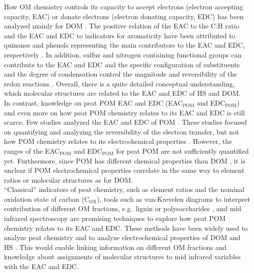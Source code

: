 \documentclass[alpha-refs]{wiley-article-rmd}
\begin{document}
\begin{refsection}
How OM chemistry controls its capacity to accept electrons (electron accepting capacity, EAC) or donate electrons (electron donating capacity, EDC) has been analyzed mainly for DOM \autocite{Ratasuk.2007,Aeschbacher.2010,Aeschbacher.2012,Fimmen.2007,HernandezMontoya.2012,Tan.2017,Walpen.2018,LaCroix.2020}. The positive relation of the EAC to the C:H ratio and the EAC and EDC to indicators for aromaticity have been attributed to quinones and phenols representing the main contributors to the EAC and EDC, respectively \autocite{Aeschbacher.2010,Tan.2017}. In addition, sulfur and nitrogen containing functional groups can contribute to the EAC and EDC \autocite{Fimmen.2007,Ratasuk.2007,HernandezMontoya.2012} and the specific configuration of substituents and the degree of condensation control the magnitude and reversibility of the redox reactions \autocite{Ratasuk.2007,Uchimiya.2009}. Overall, there is a quite detailed conceptual understanding, which molecular structures are related to the EAC and EDC of HS and DOM.\\
In contrast, knowledge on peat POM EAC and EDC (EAC\(_\text{POM}\) and EDC\(_\text{POM}\)) and even more on how peat POM chemistry relates to its EAC and EDC is still scarce. Few studies analyzed the EAC and EDC of POM \autocite{Keller.2013,Lau.2015,Lau.2016,Gao.2019}. These studies focused on quantifying and analyzing the reversibility of the electron transfer, but not how POM chemistry relates to its electrochemical properties \autocite{Keller.2013,Lau.2015,Lau.2016,Gao.2019}. However, the ranges of the EAC\(_\text{POM}\) and EDC\(_\text{POM}\) for peat POM are not sufficiently quantified yet. Furthermore, since POM has different chemical properties than DOM \autocite{Worrall.2017}, it is unclear if POM electrochemical properties correlate in the same way to element ratios or molecular structures as for DOM.\\
``Classical'' indicators of peat chemistry, such as element ratios and the nominal oxidation state of carbon (C\(_\text{OX}\)), tools such as van-Krevelen diagrams to interpret contribution of different OM fractions, e.g.~lignin or polysaccharides \autocite{Kim.2003}, and mid infrared spectroscopy are promising techniques to explore how peat POM chemistry relates to its EAC and EDC. These methods have been widely used to analyze peat chemistry and to analyze electrochemical properties of DOM and HS \autocite{Worrall.2017,Leifeld.2012,Bader.2018,Moore.2018,Leifeld.2020,Cocozza.2003,Artz.2008,Hodgkins.2018,Tfaily.2014,Aeschbacher.2010,Aeschbacher.2012,Tan.2017,Lv.2018,LaCroix.2020}. This would enable linking information on different OM fractions and knowledge about assignments of molecular structures to mid infrared variables with the EAC and EDC.\\

\end{refsection}
\end{document}
